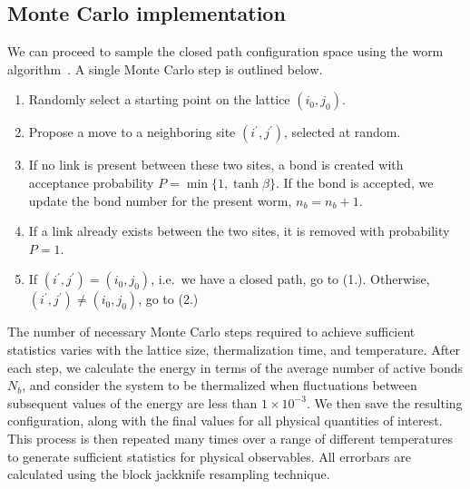 \documentclass[../main.tex]{subfiles}
\begin{document}
\subsection{Monte Carlo implementation}%
\label{ssec:monte_carlo_implementation}
We can proceed to sample the closed path configuration space using the worm
algorithm~\cite{prok87}. A single Monte Carlo step is outlined below.
%
\begin{enumerate}
    \item Randomly select a starting point on the lattice $(i_0, j_0)$.
    \item Propose a move to a neighboring site $(i^{\prime}, j^{\prime})$,
        selected at random.
    \item If no link is present between these two sites, a bond is created with
        acceptance probability $P = \min\{1, \tanh{\beta}\}$. If the bond is
        accepted, we update the bond number for the present worm, $n_b = n_b +
        1$.
    \item If a link already exists between the two sites, it is removed with
        probability $P = 1$.
    \item If $(i^{\prime}, j^{\prime}) = (i_0, j_0)$, i.e.\ we have a closed
        path, go to (1.). Otherwise, $(i^{\prime}, j^{\prime}) \neq (i_0,
        j_0)$, go to (2.)
\end{enumerate}
%
The number of necessary Monte Carlo steps required to achieve sufficient
statistics varies with the lattice size, thermalization time, and temperature.
After each step, we calculate the energy in terms of the average number of
active bonds $N_b$, and consider the system to be thermalized when fluctuations
between subsequent values of the energy are less than $1\times10^{-3}$. We then
save the resulting configuration, along with the final values for all physical
quantities of interest. This process is then repeated many times over a range
of different temperatures to generate sufficient statistics for physical
observables. All errorbars are calculated using the block jackknife resampling
technique. 
%
\end{document}
